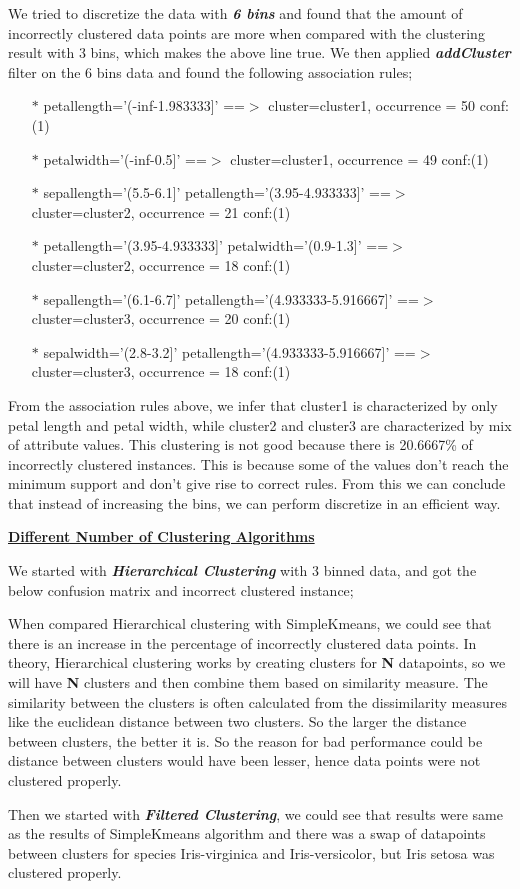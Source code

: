 \documentclass[a4paper,10pt]{article}
\begin{document}
We tried to discretize the data with \textbf{\textit{6 bins}} and found that the amount of incorrectly clustered
data points are more when compared with the clustering result with 3 bins, which makes the above line true. We then
applied \textbf{\textit{addCluster}} filter on the 6 bins data and found the following association rules;
\begin{enumerate}
  \item [$*$] petallength='(-inf-1.983333]' ==$>$ cluster=cluster1, occurrence = 50    conf:(1)
  \item [$*$] petalwidth='(-inf-0.5]' ==$>$ cluster=cluster1, occurrence = 49    conf:(1)
  \item [$*$] sepallength='(5.5-6.1]' petallength='(3.95-4.933333]' ==$>$ cluster=cluster2, occurrence = 21    conf:(1)
  \item [$*$] petallength='(3.95-4.933333]' petalwidth='(0.9-1.3]' ==$>$ cluster=cluster2, occurrence = 18    conf:(1)
  \item [$*$] sepallength='(6.1-6.7]' petallength='(4.933333-5.916667]' ==$>$ cluster=cluster3, occurrence = 20    conf:(1)
  \item [$*$] sepalwidth='(2.8-3.2]' petallength='(4.933333-5.916667]' ==$>$ cluster=cluster3, occurrence = 18    conf:(1)
\end{enumerate}
From the association rules above, we infer that cluster1 is characterized by only petal length and petal width, while
cluster2 and cluster3 are characterized by mix of attribute values. This clustering is not good because there is 20.6667\% 
of incorrectly clustered instances. This is because some of the values don't reach the minimum support and don't
give rise to correct rules. From this we can conclude that instead of increasing the bins, we can perform discretize
in an efficient way.
\par
\textbf{\underline{Different Number of Clustering Algorithms}} \par
We started with \textbf{\textit{Hierarchical Clustering}} with 3 binned data, and got the below confusion matrix and 
incorrect clustered instance;

When compared Hierarchical clustering with SimpleKmeans, we could see that there is an increase in the percentage
of incorrectly clustered data points. In theory, Hierarchical clustering works by creating clusters for \textbf{N}
datapoints, so we will have \textbf{N} clusters and then combine them based on similarity measure. The similarity 
between the clusters is often calculated from the dissimilarity measures like the euclidean distance between two 
clusters. So the larger the distance between clusters, the better it is. So the reason for bad performance
could be distance between clusters would have been lesser, hence data points were not clustered properly.
\par
Then we started with \textbf{\textit{Filtered Clustering}}, we could see that results were same as the results of
SimpleKmeans algorithm and there was a swap of datapoints between clusters for species Iris-virginica and Iris-versicolor,
but Iris setosa was clustered properly.
\end{document}

